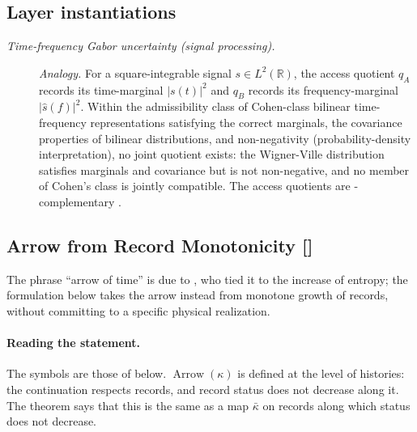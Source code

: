 \subsection*{Layer instantiations}\label{layer-inst:F37}

\begingroup\small
\begin{description}
\item[\emph{Time-frequency Gabor uncertainty (signal
processing).}] \textit{Analogy.}
For a square-integrable signal \(s\in L^2(\mathbb R)\),
the access quotient \(q_A\) records its time-marginal
\(|s(t)|^2\) and \(q_B\) records its
frequency-marginal \(|\hat s(f)|^2\).  Within the
admissibility class of Cohen-class bilinear
time-frequency representations satisfying the correct
marginals, the covariance properties of bilinear
distributions, and non-negativity (probability-density
interpretation), no joint quotient exists: the
Wigner-Ville distribution satisfies marginals and
covariance but is not non-negative, and no member of
Cohen's class is jointly compatible.  The access
quotients are -complementary
\citep{Cohen1995TimeFrequency}.

\end{description}
\endgroup


\subsection{Arrow from Record Monotonicity [\texorpdfstring{}{F38}]}\label{sec:self-reference-limits:arrow}

The phrase ``arrow of time'' is due to \citet{Eddington1928Nature}, who tied it to the increase of entropy; the formulation below takes the arrow instead from monotone growth of records, without committing to a specific physical realization.

\paragraph{Reading the statement.} The symbols are those of  below.
\(\operatorname{Arrow}(\kappa)\) is defined at the level of histories:
the continuation respects records, and record status does not decrease along
it. The theorem says that this is the same as a map \(\bar\kappa\) on records
along which status does not decrease.

